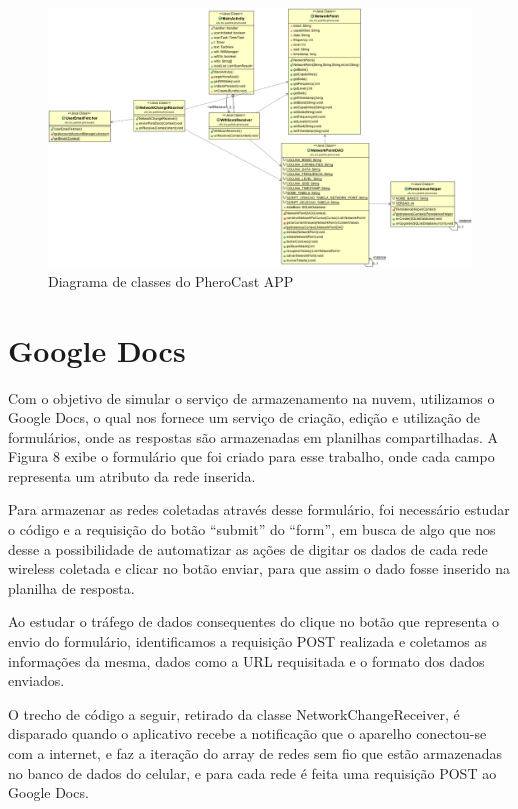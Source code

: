 \documentclass[12pt, %
openright, 
oneside,
a4paper,
brazil]{facom-ufu-abntex2}
\begin{document}
  
  \begin{figure}[hbt]
  \includegraphics [scale=.3] {diagrama}
  \caption{Diagrama de classes do PheroCast APP}
\end{figure}
  

 \section{Google Docs}
Com o objetivo de simular o serviço de armazenamento na nuvem, utilizamos o Google Docs, o qual nos fornece um serviço de criação, edição e utilização de formulários, onde as respostas são armazenadas em planilhas compartilhadas. A Figura 8 exibe o formulário que foi criado para esse trabalho, onde cada campo representa um atributo da rede inserida.

Para armazenar as redes coletadas através desse formulário, foi necessário estudar o código e a requisição do botão ``submit'' do ``form'', em busca de algo que nos desse a possibilidade de automatizar as ações de digitar os dados de cada rede wireless coletada e clicar no botão enviar, para que assim o dado fosse inserido na planilha de resposta.

Ao estudar o tráfego de dados consequentes do clique no botão que representa o envio do formulário, identificamos a requisição POST realizada e coletamos as informações da mesma, dados como a URL requisitada e o formato dos dados enviados. 

O trecho de código a seguir, retirado da classe NetworkChangeReceiver, é disparado quando o aplicativo recebe a notificação que o aparelho conectou-se com a internet, e faz a iteração do array de redes sem fio que estão armazenadas no banco de dados do celular, e para cada rede é feita uma requisição POST ao Google Docs.
\end{document}
